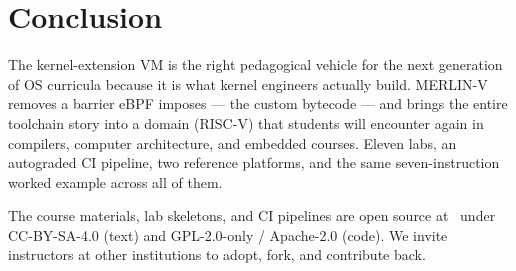 \documentclass[11pt,a4paper]{article}
\begin{document}
\section{Conclusion}

The kernel-extension VM is the right pedagogical vehicle for
the next generation of OS curricula because it is what kernel
engineers actually build.  MERLIN-V removes a barrier eBPF
imposes --- the custom bytecode --- and brings the entire
toolchain story into a domain (RISC-V) that students will
encounter again in compilers, computer architecture, and
embedded courses.  Eleven labs, an autograded CI pipeline,
two reference platforms, and the same seven-instruction worked
example across all of them.

The course materials, lab skeletons, and CI pipelines are open
source at~\cite{merlinv-design} under CC-BY-SA-4.0 (text) and
GPL-2.0-only / Apache-2.0 (code).  We invite instructors at
other institutions to adopt, fork, and contribute back.



\end{document}
